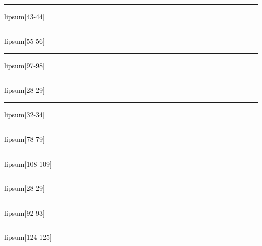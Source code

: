\documentclass[11pt,a4paper]{article}
\begin{document}
\begin{simplewrap}
  \textcolor{purple!31}{\rule{6.0cm}{5.9cm}}
\end{simplewrap}
lipsum[43-44]

\begin{simplewrap}
  \textcolor{pink!11}{\rule{3.7cm}{7.8cm}}
\end{simplewrap}
lipsum[55-56]

\begin{simplewrap}
  \textcolor{cyan!20}{\rule{3.4cm}{7.7cm}}
\end{simplewrap}
lipsum[97-98]

\begin{simplewrap}
  \textcolor{teal!59}{\rule{4.6cm}{2.4cm}}
\end{simplewrap}
lipsum[28-29]

\begin{simplewrap}
  \textcolor{red!13}{\rule{5.1cm}{5.3cm}}
\end{simplewrap}
lipsum[32-34]

\begin{simplewrap}
  \textcolor{red!54}{\rule{3.5cm}{7.6cm}}
\end{simplewrap}
lipsum[78-79]

\begin{simplewrap}
  \textcolor{orange!52}{\rule{4.6cm}{7.0cm}}
\end{simplewrap}
lipsum[108-109]

\begin{simplewrap}
  \textcolor{orange!42}{\rule{5.2cm}{2.9cm}}
\end{simplewrap}
lipsum[28-29]

\begin{simplewrap}
  \textcolor{yellow!59}{\rule{3.8cm}{6.2cm}}
\end{simplewrap}
lipsum[92-93]

\begin{simplewrap}
  \textcolor{violet!20}{\rule{3.1cm}{6.0cm}}
\end{simplewrap}
lipsum[124-125]
\end{document}
